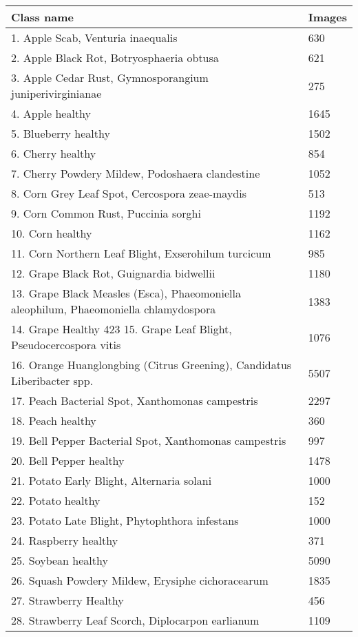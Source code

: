 \begin{table}[]
\begin{tabular}{@{}|p{10cm}|p{3cm}|@{}}
\hline
 \centering \textbf{Class name} & \textbf{Images}  \\ \hline
 1. Apple Scab, Venturia inaequalis & 630 \\ 
 2. Apple Black Rot, Botryosphaeria obtusa & 621  \\ 
 3. Apple Cedar Rust, Gymnosporangium juniperivirginianae & 275 \\
 4. Apple healthy & 1645 \\
 5. Blueberry healthy &  1502 \\
 6. Cherry healthy & 854 \\
 7. Cherry Powdery Mildew, Podoshaera clandestine & 1052 \\
 8. Corn Grey Leaf Spot, Cercospora zeae-maydis & 513 \\
 9. Corn Common Rust, Puccinia sorghi & 1192 \\
 10. Corn healthy & 1162 \\
 11. Corn Northern Leaf Blight, Exserohilum turcicum & 985 \\
 12. Grape Black Rot, Guignardia bidwellii & 1180\\
 13. Grape Black Measles (Esca), Phaeomoniella aleophilum,
 Phaeomoniella chlamydospora & 1383 \\
 14. Grape Healthy 423
15. Grape Leaf Blight, Pseudocercospora vitis & 1076 \\
16. Orange Huanglongbing (Citrus Greening), Candidatus
Liberibacter spp. & 5507 \\
17. Peach Bacterial Spot, Xanthomonas campestris & 2297 \\
18. Peach healthy & 360 \\
19. Bell Pepper Bacterial Spot, Xanthomonas campestris & 997 \\
20. Bell Pepper healthy & 1478 \\
21. Potato Early Blight, Alternaria solani & 1000 \\
22. Potato healthy & 152 \\
23. Potato Late Blight, Phytophthora infestans & 1000 \\
24. Raspberry healthy & 371 \\
25. Soybean healthy & 5090 \\
26. Squash Powdery Mildew, Erysiphe cichoracearum & 1835 \\
27. Strawberry Healthy & 456 \\
28. Strawberry Leaf Scorch, Diplocarpon earlianum & 1109 \\

\end{tabular}
\end{table}
